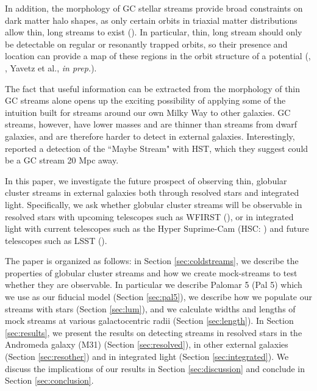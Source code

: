 \documentclass[twocolumn]{aastex62}
\begin{document}
In addition, the morphology of GC stellar streams provide broad constraints on  dark matter halo shapes, as only certain orbits in triaxial matter distributions allow thin, long streams to exist (\citealt{pearson15}). In particular, thin, long stream should only be detectable on regular or resonantly trapped orbits, so their presence and location can provide a map of these regions in the orbit structure of a potential (\citealt{pearson15}, \citealt{price16}, Yavetz et al., {\it in prep.}).

The fact that useful information can be extracted from the morphology of thin GC streams alone opens up the exciting possibility of applying some of the intuition built for streams around our own Milky Way to other galaxies.  GC streams, however, have lower masses and are thinner than streams from dwarf galaxies, and are therefore harder to detect in external galaxies. Interestingly, \citet{abraham18} reported a detection of the ``Maybe Stream" with HST, which they suggest could be a GC stream 20 Mpc away. 


In this paper, we investigate the future prospect of observing thin, globular cluster streams in external galaxies both through resolved stars and integrated light. 
Specifically, we ask whether globular cluster streams will be observable in resolved stars with upcoming telescopes such as WFIRST (\citealt{spergel13}), or in integrated light with current telescopes such as the Hyper Suprime-Cam (HSC: \citealt{miyazaki12}) and future telescopes such as LSST (\citealt{ivezi08}). %

The paper is organized as follows: in Section \ref{sec:coldstreams}, we describe the properties of globular cluster streams and how we create mock-streams to test whether they are observable. In particular we describe Palomar 5 (Pal 5) which we use as our fiducial model (Section \ref{sec:pal5}), we describe how we populate our streams with stars (Section \ref{sec:lum}), and we calculate widths and lengths of mock streams at various galactocentric radii (Section \ref{sec:length}). In Section \ref{sec:results}, we present the results on detecting streams in resolved stars in the Andromeda galaxy (M31) (Section \ref{sec:resolved}), in other external galaxies (Section \ref{sec:resother}) and in integrated light (Section \ref{sec:integrated}). We discuss the implications of our results in Section \ref{sec:discussion} and conclude in Section \ref{sec:conclusion}.
%
\end{document}
